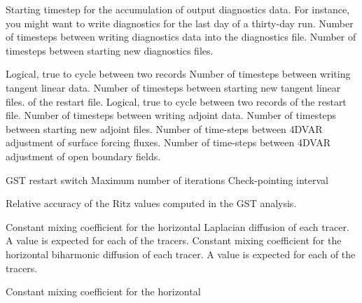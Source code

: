 \begin{klist}
\begin{klist}
           Starting timestep for the accumulation of
     output diagnostics data.  For instance, you might want to write
     diagnostics for the last day of a thirty-day run.
             Number of timesteps between writing
     diagnostics data into the diagnostics file.
             Number of timesteps between starting
     new diagnostics files.
     \end{klist}
     \mbox{}
     \begin{klist}
        Logical, true to cycle between two records
             Number of timesteps between writing
     tangent linear data.
             Number of timesteps between starting
     new tangent linear files.
     of the restart file.
        Logical, true to cycle between two records
     of the restart file.
             Number of timesteps between writing
     adjoint data.
             Number of timesteps between starting
     new adjoint files.
            Number of time-steps between 4DVAR adjustment of
       surface forcing fluxes.
           Number of time-steps between 4DVAR adjustment of
       open boundary fields.
     \end{klist}
     \mbox{}
     \begin{klist}
        GST restart switch
        Maximum number of iterations
        Check-pointing interval
     \end{klist}
     \mbox{}
     \begin{klist}
        Relative accuracy of the Ritz values
       computed in the GST analysis.
     \end{klist}
    \mbox{}
     \begin{klist}
            Constant mixing
     coefficient for the horizontal Laplacian diffusion of each tracer.
     A value is expected for each of the  tracers.
            Constant mixing
     coefficient for the horizontal biharmonic diffusion of each tracer.
     A value is expected for each of the  tracers.
     \end{klist}
    \mbox{}
     \begin{klist}
           Constant mixing coefficient for the horizontal

\end{klist}
\end{klist}
